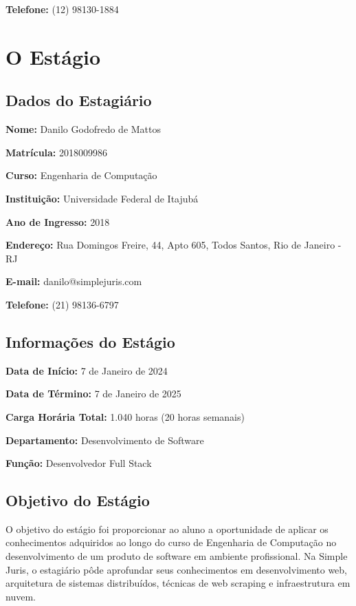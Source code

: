\documentclass[
	12pt,
	oneside,
	a4paper,
	brazil,
	sumario=tradicional
]{abntex2}
\begin{document}
\noindent\textbf{Telefone:} (12) 98130-1884

\chapter{O Estágio}

\section{Dados do Estagiário}

\noindent\textbf{Nome:} Danilo Godofredo de Mattos

\noindent\textbf{Matrícula:} 2018009986

\noindent\textbf{Curso:} Engenharia de Computação

\noindent\textbf{Instituição:} Universidade Federal de Itajubá

\noindent\textbf{Ano de Ingresso:} 2018

\noindent\textbf{Endereço:} Rua Domingos Freire, 44, Apto 605, Todos Santos, Rio de Janeiro - RJ

\noindent\textbf{E-mail:} danilo@simplejuris.com

\noindent\textbf{Telefone:} (21) 98136-6797

\section{Informações do Estágio}

\noindent\textbf{Data de Início:} 7 de Janeiro de 2024

\noindent\textbf{Data de Término:} 7 de Janeiro de 2025

\noindent\textbf{Carga Horária Total:} 1.040 horas (20 horas semanais)

\noindent\textbf{Departamento:} Desenvolvimento de Software

\noindent\textbf{Função:} Desenvolvedor Full Stack

\section{Objetivo do Estágio}

O objetivo do estágio foi proporcionar ao aluno a oportunidade de aplicar os conhecimentos adquiridos ao longo do curso de Engenharia de Computação no desenvolvimento de um produto de software em ambiente profissional. Na Simple Juris, o estagiário pôde aprofundar seus conhecimentos em desenvolvimento web, arquitetura de sistemas distribuídos, técnicas de web scraping e infraestrutura em nuvem.
\end{document}

